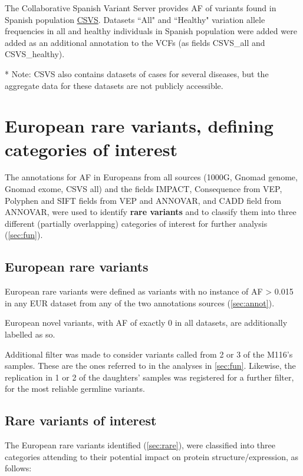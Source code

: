 \documentclass{article}\usepackage[]{graphicx}\usepackage[dvipsnames]{xcolor}
\begin{document}
The Collaborative Spanish Variant Server \cite{pena2021csvs} provides \textsc{AF} of variants found in Spanish population \href{http://csvs.babelomics.org/}{CSVS}. Datasets ``All" and ``Healthy"  variation allele frequencies in all and healthy individuals in Spanish population were added were added as an additional annotation to the VCFs (as fields CSVS\_all and CSVS\_healthy).

* Note: CSVS also contains datasets of cases for several diseases, but the aggregate data for these datasets are not publicly accessible.



 
\section{European rare variants, defining categories of interest}
\label{sec:vardef}

The annotations for AF in Europeans from all sources (1000G, Gnomad genome, Gnomad exome, CSVS all) and the fields IMPACT, Consequence from VEP,  Polyphen and SIFT fields from VEP and ANNOVAR, and CADD field from ANNOVAR, were used to identify \textbf{rare variants} and to classify them into three different (partially overlapping) categories of interest for further analysis (\autoref{sec:fun}).

\subsection{European rare variants}
\label{sec:rare}
European rare variants were defined as variants with no instance of AF > 0.015 in any EUR dataset from any of the two annotations sources (\autoref{sec:annot}).

European novel variants, with AF of exactly 0 in all datasets, are additionally labelled as so.

Additional filter was made to consider variants called from 2 or 3 of the M116's samples. These are the ones referred to in the analyses in \autoref{sec:fun}. Likewise, the replication in 1 or 2 of the daughters' samples was registered for a further filter, for the most reliable germline variants.

\subsection{Rare variants of interest}
\label{sec:rareinteresting}


The European rare variants identified (\autoref{sec:rare}), were classified into three categories attending to their potential impact on protein structure/expression, as follows:
\end{document}
